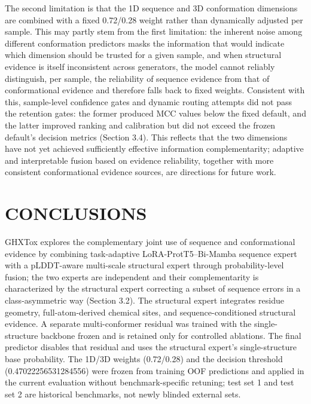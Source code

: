 \documentclass[12pt]{article}
\begin{document}
The second limitation is that the 1D sequence and 3D conformation dimensions
are combined with a fixed 0.72/0.28 weight rather than dynamically adjusted
per sample. This may partly stem from the first limitation: the inherent noise
among different conformation predictors masks the information that would
indicate which dimension should be trusted for a given sample, and when
structural evidence is itself inconsistent across generators, the model cannot
reliably distinguish, per sample, the reliability of sequence evidence from
that of conformational evidence and therefore falls back to fixed weights.
Consistent with this, sample-level confidence gates and dynamic routing
attempts did not pass the retention gates: the former produced MCC values
below the fixed default, and the latter improved ranking and calibration but
did not exceed the frozen default's decision metrics (Section 3.4). This
reflects that the two dimensions have not yet achieved sufficiently effective
information complementarity; adaptive and interpretable fusion based on
evidence reliability, together with more consistent conformational evidence
sources, are directions for future work.
\section{CONCLUSIONS}
GHXTox explores the complementary joint use of sequence and conformational
evidence by combining task-adaptive LoRA-ProtT5--Bi-Mamba sequence expert
with a pLDDT-aware multi-scale structural expert through probability-level
fusion; the two experts are independent and their complementarity is
characterized by the structural expert correcting a subset of sequence errors
in a class-asymmetric way (Section 3.2). The structural expert integrates residue geometry, full-atom-derived
chemical sites, and sequence-conditioned structural evidence. A separate
multi-conformer residual was trained with the single-structure backbone frozen
and is retained only for controlled ablations. The final predictor disables
that residual and uses the structural expert's single-structure base
probability. The 1D/3D weights (0.72/0.28) and the decision threshold
(0.47022256531284556) were frozen from training OOF predictions and applied in
the current evaluation without benchmark-specific retuning; test set 1 and test set 2
are historical benchmarks, not newly blinded external sets.
\end{document}
